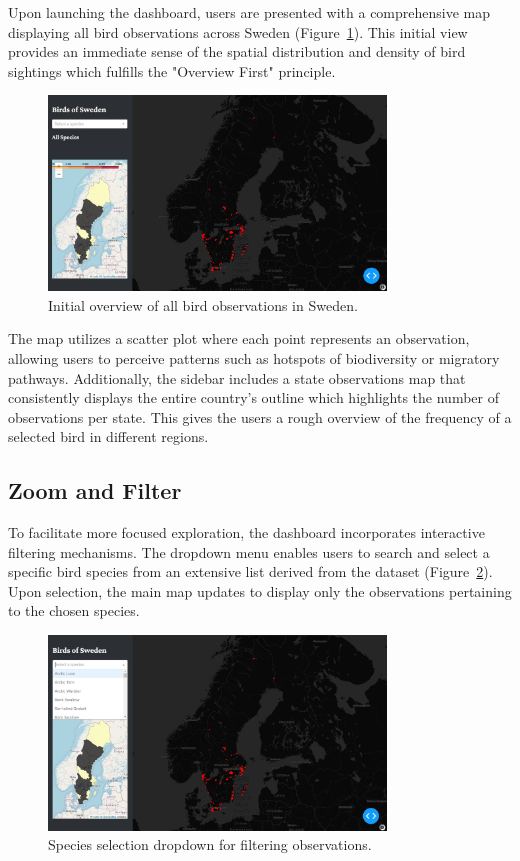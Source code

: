 Upon launching the dashboard, users are presented with a comprehensive map displaying all bird observations across Sweden (Figure~\ref{fig:overview}). This initial view provides an immediate sense of the spatial distribution and density of bird sightings which fulfills the "Overview First" principle.

\begin{figure}[h] 
    \centering 
    \includegraphics[width=0.8\textwidth]{figures/overview_map.jpg} 
    \caption{Initial overview of all bird observations in Sweden.} 
    \label{fig:overview} 
\end{figure}

The map utilizes a scatter plot where each point represents an observation, allowing users to perceive patterns such as hotspots of biodiversity or migratory pathways. Additionally, the sidebar includes a state observations map that consistently displays the entire country's outline which highlights the number of observations per state. This gives the users a rough overview of the frequency of a selected bird in different regions.

\subsection{Zoom and Filter}

To facilitate more focused exploration, the dashboard incorporates interactive filtering mechanisms. The dropdown menu enables users to search and select a specific bird species from an extensive list derived from the dataset (Figure~\ref{fig:dropdown}). Upon selection, the main map updates to display only the observations pertaining to the chosen species.

\begin{figure}[h] 
    \centering 
    \includegraphics[width=0.8\textwidth]{figures/species_dropdown.jpg} 
    \caption{Species selection dropdown for filtering observations.} 
    \label{fig:dropdown} 
\end{figure}

